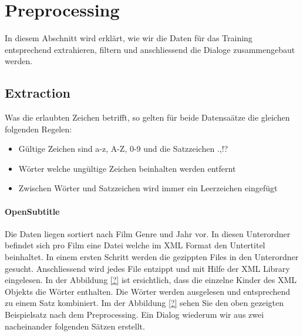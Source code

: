 \section{Preprocessing}
In diesem Abschnitt wird erklärt, wie wir die Daten für das Training entsprechend extrahieren, filtern und anschliessend die Dialoge zusammengebaut werden.
\subsection{Extraction}
Was die erlaubten Zeichen betrifft, so gelten für beide Datensaätze die gleichen folgenden Regelen:
\begin{itemize}
	\item Gültige Zeichen sind a-z, A-Z, 0-9 und die Satzzeichen .,!?
	\item Wörter welche ungültige Zeichen beinhalten werden entfernt
	\item Zwischen Wörter und Satzzeichen wird immer ein Leerzeichen eingefügt
\end{itemize}
\paragraph{OpenSubtitle} Die Daten liegen sortiert nach Film Genre und Jahr vor. In diesen Unterordner befindet sich pro Film eine Datei welche im XML Format den Untertitel beinhaltet.
In einem ersten Schritt werden die gezippten Files in den Unterordner gesucht. Anschliessend wird jedes File entzippt und mit Hilfe der XML Library eingelesen. In der Abbildung \ref{?} ist ersichtlich, dass die einzelne Kinder des XML Objekts die Wörter enthalten. Die Wörter werden ausgelesen und entsprechend zu einem Satz kombiniert. Im der Abbildung \ref{?} sehen Sie den oben gezeigten Beispielsatz nach dem Preprocessing. Ein Dialog wiederum wir aus zwei nacheinander folgenden Sätzen erstellt.
